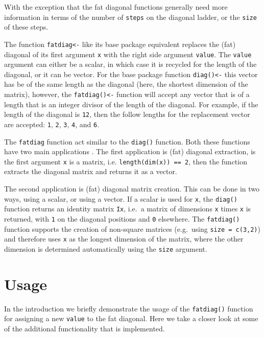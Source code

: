 \documentclass[article]{jss}
\begin{document}
With the exception that the fat diagonal functions generally need more
information in terms of the number of \texttt{steps} on the diagonal
ladder, or the \texttt{size} of these steps.

The function \texttt{fatdiag\textless{}-} like its base package
equivalent replaces the (fat) diagonal of its first argument \texttt{x}
with the right side argument \texttt{value}. The \texttt{value} argument
can either be a scalar, in which case it is recycled for the length of
the diagonal, or it can be vector. For the base package function
\texttt{diag()\textless{}-} this vector has be of the same length as the
diagonal (here, the shortest dimension of the matrix), however, the
\texttt{fatdiag()\textless{}-} function will accept any vector that is
of a length that is an integer divisor of the length of the diagonal.
For example, if the length of the diagonal is \texttt{12}, then the
follow lengths for the replacement vector are accepted: \texttt{1},
\texttt{2}, \texttt{3}, \texttt{4}, and \texttt{6}.

The \texttt{fatdiag} function act similar to the \texttt{diag()}
function. Both these functions have two main applications . The first
application is (fat) diagonal extraction, is the first argument
\texttt{x} is a matrix, i.e. \texttt{length(dim(x)) == 2}, then the
function extracts the diagonal matrix and returns it as a vector.

The second application is (fat) diagonal matrix creation. This can be
done in two ways, using a scalar, or using a vector. If a scalar is used
for \texttt{x}, the \texttt{diag()} function returns an identity matrix
\texttt{Ix}, i.e.~a matrix of dimensions \texttt{x} times \texttt{x} is
returned, with \texttt{1} on the diagonal positions and \texttt{0}
elsewhere. The \texttt{fatdiag()} function supports the creation of
non-square matrices (e.g.~using \texttt{size = c(3,2)}) and therefore
uses \texttt{x} as the longest dimension of the matrix, where the other
dimension is determined automatically using the \texttt{size} argument.

\section{Usage}\label{usage}

In the introduction we briefly demonstrate the usage of the
\texttt{fatdiag()} function for assigning a new \texttt{value} to the
fat diagonal. Here we take a closer look at some of the additional
functionality that is implemented.
\end{document}
